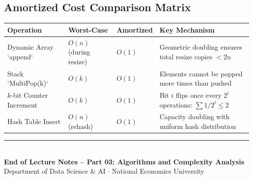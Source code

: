 \documentclass[11pt,a4paper]{article}
\begin{document}
\subsection{Amortized Cost Comparison Matrix}
\begin{center}
\begin{tabularx}{\textwidth}{p{3.5cm} p{2.5cm} p{2.5cm} X}
\toprule
\textbf{Operation} & \textbf{Worst-Case} & \textbf{Amortized} & \textbf{Key Mechanism} \\
\midrule
Dynamic Array `append` & $O(n)$ (during resize) & $O(1)$ & Geometric doubling ensures total resize copies $< 2n$ \\
Stack `MultiPop(k)` & $O(k)$ & $O(1)$ & Elements cannot be popped more times than pushed \\
$k$-bit Counter Increment & $O(k)$ & $O(1)$ & Bit $i$ flips once every $2^i$ operations: $\sum 1/2^i \le 2$ \\
Hash Table Insert & $O(n)$ (rehash) & $O(1)$ & Capacity doubling with uniform hash distribution \\
\bottomrule
\end{tabularx}
\end{center}

\vspace{1.5em}
\begin{center}
\rule{0.6\textwidth}{0.6pt}\\[0.4em]
{\small\color{ForestGreen}\textbf{End of Lecture Notes -- Part 03: Algorithms and Complexity Analysis}}\\[0.2em]
{\footnotesize\color{DarkGray}Department of Data Science \& AI $\cdot$ National Economics University}
\end{center}
\end{document}
